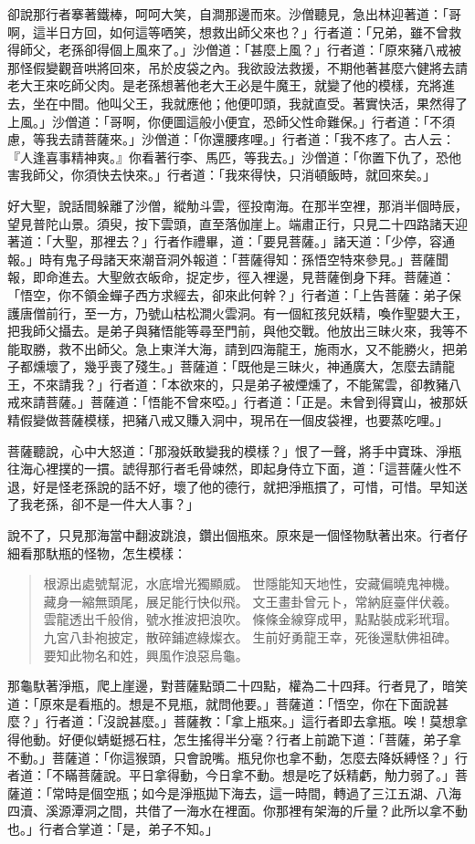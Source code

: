 卻說那行者搴著鐵棒，呵呵大笑，自澗那邊而來。沙僧聽見，急出林迎著道：「哥啊，這半日方回，如何這等哂笑，想救出師父來也？」行者道：「兄弟，雖不曾救得師父，老孫卻得個上風來了。」沙僧道：「甚麼上風？」行者道：「原來豬八戒被那怪假變觀音哄將回來，吊於皮袋之內。我欲設法救援，不期他著甚麼六健將去請老大王來吃師父肉。是老孫想著他老大王必是牛魔王，就變了他的模樣，充將進去，坐在中間。他叫父王，我就應他；他便叩頭，我就直受。著實快活，果然得了上風。」沙僧道：「哥啊，你便圖這般小便宜，恐師父性命難保。」行者道：「不須慮，等我去請菩薩來。」沙僧道：「你還腰疼哩。」行者道：「我不疼了。古人云：『人逢喜事精神爽。』你看著行李、馬匹，等我去。」沙僧道：「你置下仇了，恐他害我師父，你須快去快來。」行者道：「我來得快，只消頓飯時，就回來矣。」

好大聖，說話間躲離了沙僧，縱觔斗雲，徑投南海。在那半空裡，那消半個時辰，望見普陀山景。須臾，按下雲頭，直至落伽崖上。端肅正行，只見二十四路諸天迎著道：「大聖，那裡去？」行者作禮畢，道：「要見菩薩。」諸天道：「少停，容通報。」時有鬼子母諸天來潮音洞外報道：「菩薩得知：孫悟空特來參見。」菩薩聞報，即命進去。大聖斂衣皈命，捉定步，徑入裡邊，見菩薩倒身下拜。菩薩道：「悟空，你不領金蟬子西方求經去，卻來此何幹？」行者道：「上告菩薩：弟子保護唐僧前行，至一方，乃號山枯松澗火雲洞。有一個紅孩兒妖精，喚作聖嬰大王，把我師父攝去。是弟子與豬悟能等尋至門前，與他交戰。他放出三昧火來，我等不能取勝，救不出師父。急上東洋大海，請到四海龍王，施雨水，又不能勝火，把弟子都燻壞了，幾乎喪了殘生。」菩薩道：「既他是三昧火，神通廣大，怎麼去請龍王，不來請我？」行者道：「本欲來的，只是弟子被煙燻了，不能駕雲，卻教豬八戒來請菩薩。」菩薩道：「悟能不曾來啞。」行者道：「正是。未曾到得寶山，被那妖精假變做菩薩模樣，把豬八戒又賺入洞中，現吊在一個皮袋裡，也要蒸吃哩。」

菩薩聽說，心中大怒道：「那潑妖敢變我的模樣？」恨了一聲，將手中寶珠、淨瓶往海心裡撲的一摜。諕得那行者毛骨竦然，即起身侍立下面，道：「這菩薩火性不退，好是怪老孫說的話不好，壞了他的德行，就把淨瓶摜了，可惜，可惜。早知送了我老孫，卻不是一件大人事？」

說不了，只見那海當中翻波跳浪，鑽出個瓶來。原來是一個怪物馱著出來。行者仔細看那馱瓶的怪物，怎生模樣：
\begin{quote}
根源出處號幫泥，水底增光獨顯威。
世隱能知天地性，安藏偏曉鬼神機。
藏身一縮無頭尾，展足能行快似飛。
文王畫卦曾元卜，常納庭臺伴伏羲。
雲龍透出千般俏，號水推波把浪吹。
條條金線穿成甲，點點裝成彩玳瑁。
九宮八卦袍披定，散碎鋪遮綠燦衣。
生前好勇龍王幸，死後還馱佛祖碑。
要知此物名和姓，興風作浪惡烏龜。
\end{quote}

那龜馱著淨瓶，爬上崖邊，對菩薩點頭二十四點，權為二十四拜。行者見了，暗笑道：「原來是看瓶的。想是不見瓶，就問他要。」菩薩道：「悟空，你在下面說甚麼？」行者道：「沒說甚麼。」菩薩教：「拿上瓶來。」這行者即去拿瓶。唉！莫想拿得他動。好便似蜻蜓撼石柱，怎生搖得半分毫？行者上前跪下道：「菩薩，弟子拿不動。」菩薩道：「你這猴頭，只會說嘴。瓶兒你也拿不動，怎麼去降妖縛怪？」行者道：「不瞞菩薩說。平日拿得動，今日拿不動。想是吃了妖精虧，觔力弱了。」菩薩道：「常時是個空瓶；如今是淨瓶拋下海去，這一時間，轉過了三江五湖、八海四瀆、溪源潭洞之間，共借了一海水在裡面。你那裡有架海的斤量？此所以拿不動也。」行者合掌道：「是，弟子不知。」

